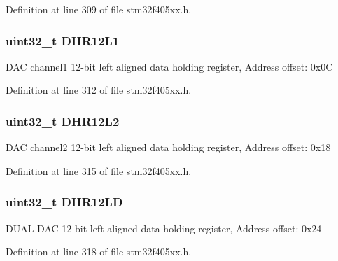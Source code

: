Definition at line 309 of file stm32f405xx.\+h.

\subsubsection[{\texorpdfstring{D\+H\+R12\+L1}{DHR12L1}}]{ uint32\+\_\+t D\+H\+R12\+L1}\hypertarget{struct_d_a_c___type_def_ae9028b8bcb5118b7073165fb50fcd559}{}\label{struct_d_a_c___type_def_ae9028b8bcb5118b7073165fb50fcd559}
D\+AC channel1 12-\/bit left aligned data holding register, Address offset\+: 0x0C 

Definition at line 312 of file stm32f405xx.\+h.

\subsubsection[{\texorpdfstring{D\+H\+R12\+L2}{DHR12L2}}]{ uint32\+\_\+t D\+H\+R12\+L2}\hypertarget{struct_d_a_c___type_def_a2e45f9c9d67e384187b25334ba0a3e3d}{}\label{struct_d_a_c___type_def_a2e45f9c9d67e384187b25334ba0a3e3d}
D\+AC channel2 12-\/bit left aligned data holding register, Address offset\+: 0x18 

Definition at line 315 of file stm32f405xx.\+h.

\subsubsection[{\texorpdfstring{D\+H\+R12\+LD}{DHR12LD}}]{ uint32\+\_\+t D\+H\+R12\+LD}\hypertarget{struct_d_a_c___type_def_acc269320aff0a6482730224a4b641a59}{}\label{struct_d_a_c___type_def_acc269320aff0a6482730224a4b641a59}
D\+U\+AL D\+AC 12-\/bit left aligned data holding register, Address offset\+: 0x24 

Definition at line 318 of file stm32f405xx.\+h.

